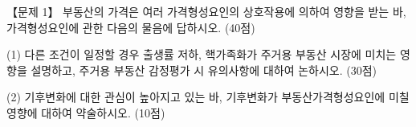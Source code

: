 \begin{longquestion}{【문제 1】}
부동산의 가격은 여러 가격형성요인의 상호작용에 의하여 영향을 받는 바, 가격형성요인에 관한 다음의 물음에 답하시오. (40점) \par
\medskip\noindent (1) 다른 조건이 일정할 경우 출생률 저하, 핵가족화가 주거용 부동산 시장에 미치는 영향을 설명하고, 주거용 부동산 감정평가 시 유의사항에 대하여 논하시오. (30점) \par
\medskip\noindent (2) 기후변화에 대한 관심이 높아지고 있는 바, 기후변화가 부동산가격형성요인에 미칠 영향에 대하여 약술하시오. (10점) \par
\end{longquestion}
